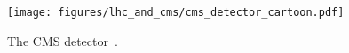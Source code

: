 \begin{figure}
\centering
\texttt{[image: figures/lhc\_and\_cms/cms\_detector\_cartoon.pdf]}
\caption{The CMS detector~\cite{cms_detector_cartoon}.}
\label{cms_detector_cartoon}
\end{figure}